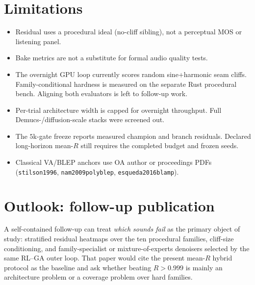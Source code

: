 \section{Limitations}
\label{sec:limitations}

\begin{itemize}
  \item Residual uses a procedural ideal (no-cliff sibling), not a perceptual MOS or listening panel.
  \item Bake metrics are not a substitute for formal audio quality tests.
  \item The overnight GPU loop currently scores random sine+harmonic seam cliffs. Family-conditional hardness is measured on the separate Rust procedural bench. Aligning both evaluators is left to follow-up work.
  \item Per-trial architecture width is capped for overnight throughput. Full Demucs-/diffusion-scale stacks were screened out.
  \item The $5$k-gate freeze reports measured champion and branch residuals. Declared long-horizon mean-$R$ still requires the completed budget and frozen seeds.
  \item Classical VA/BLEP anchors use OA author or proceedings PDFs (\texttt{stilson1996}, \texttt{nam2009polyblep}, \texttt{esqueda2016blamp}).
\end{itemize}

\section{Outlook: follow-up publication}
\label{sec:outlook}

A self-contained follow-up can treat \emph{which sounds fail} as the primary object of study: stratified residual heatmaps over the ten procedural families, cliff-size conditioning, and family-specialist or mixture-of-experts denoisers selected by the same RL--GA outer loop.
That paper would cite the present mean-$R$ hybrid protocol as the baseline and ask whether beating $R>0.999$ is mainly an architecture problem or a coverage problem over hard families.
